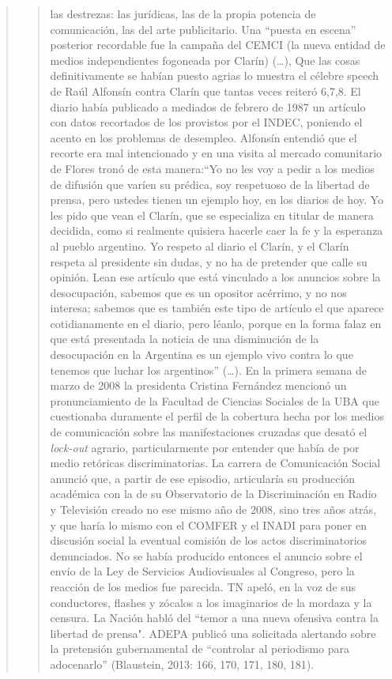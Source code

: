 \begin{quote}
\begin{quote}
las destrezas: las jurídicas, las de la propia potencia de comunicación, las del arte publicitario. Una ``puesta en escena'' posterior recordable fue la campaña del CEMCI (la nueva entidad de medios independientes fogoneada por Clarín) (\dots), Que las cosas definitivamente se habían puesto agrias lo muestra el célebre speech de Raúl Alfonsín contra Clarín que tantas veces reiteró 6,7,8. El diario había publicado a mediados de febrero de 1987 un artículo con datos recortados de los provistos por el INDEC, poniendo el acento en los problemas de desempleo. Alfonsín entendió que el recorte era mal intencionado y en una visita al mercado comunitario de Flores tronó de esta manera:\enquote{Yo no les voy a pedir a los medios de difusión que varíen su prédica, soy respetuoso de la libertad de prensa, pero ustedes tienen un ejemplo hoy, en los diarios de hoy. Yo les pido que vean el Clarín, que se especializa en titular de manera decidida, como si realmente quisiera hacerle caer la fe y la esperanza al pueblo argentino. Yo respeto al diario el Clarín, y el Clarín respeta al presidente sin dudas, y no ha de pretender que calle su opinión. Lean ese artículo que está vinculado a los anuncios sobre la desocupación, sabemos que es un opositor acérrimo, y no nos interesa; sabemos que es también este tipo de artículo el que aparece cotidianamente en el diario, pero léanlo, porque en la forma falaz en que está presentada la noticia de una disminución de la desocupación en la Argentina es un ejemplo vivo contra lo que tenemos que luchar los argentinos} (\dots). En la primera semana de marzo de 2008 la presidenta Cristina Fernández mencionó un pronunciamiento de la Facultad de Ciencias Sociales de la UBA que cuestionaba duramente el perfil de la cobertura hecha por los medios de comunicación sobre las manifestaciones cruzadas que desató el \emph{lock-out} agrario, particularmente por entender que había de por medio retóricas discriminatorias. La carrera de Comunicación Social anunció que, a partir de ese episodio, articularía su producción académica con la de su Observatorio de la Discriminación en Radio y Televisión creado no ese mismo año de 2008, sino tres años atrás, y que haría lo mismo con el COMFER y el INADI para poner en discusión social la eventual comisión de los actos discriminatorios denunciados. No se había producido entonces el anuncio sobre el envío de la Ley de Servicios Audiovisuales al Congreso, pero la reacción de los medios fue parecida. TN apeló, en la voz de sus conductores, flashes y zócalos a los imaginarios de la mordaza y la censura. La Nación habló del ``temor a una nueva ofensiva contra la libertad de prensa". ADEPA publicó una solicitada alertando sobre la pretensión gubernamental de ``controlar al periodismo para adocenarlo'' (Blaustein, 2013: 166, 170, 171, 180, 181).
\end{quote}



\end{quote}
